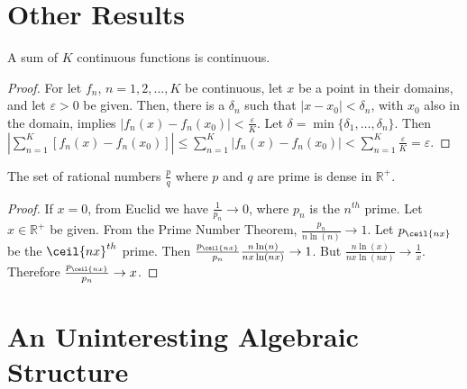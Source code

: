 \documentclass[crop=false,class=book,oneside]{standalone}
\begin{document}
        \section{Other Results}
            \begin{theorem}
                A sum of $K$ continuous functions is continuous. 
            \end{theorem}
            \begin{proof}
                For let $f_n$, $n=1,2,\hdots,K$ be continuous,
                let $x$ be a point in their domains, and let
                $\varepsilon>0$ be given. Then, there is a
                $\delta_n$ such that $|x-x_0|<\delta_n$, with
                $x_0$ also in the domain, implies
                $|f_n(x)-f_n(x_0)|<\frac{\varepsilon}{K}$.
                Let $\delta=\min\{\delta_1,\hdots,\delta_n\}$. Then
                $|\sum_{n=1}^{K}[f_n(x)-f_n(x_0)]|\leq%
                  \sum_{n=1}^{K}|f_n(x)-f_n(x_0)|<%
                  \sum_{n=1}^{K}\frac{\varepsilon}{K}=\varepsilon$.
            \end{proof}
            \begin{theorem}
                The set of rational numbers $\frac{p}{q}$ where $p$
                and $q$ are prime is dense in $\mathbb{R}^{+}$.
            \end{theorem}
            \begin{proof}
                If $x=0$, from Euclid we have
                $\frac{1}{p_n}\rightarrow 0$,
                where $p_n$ is the $n^{th}$ prime. Let
                $x\in\mathbb{R}^{+}$ be given. From the Prime Number
                Theorem, $\frac{p_n}{n\ln(n)}\rightarrow 1$. Let
                $p_{\ceil{nx}}$ be the $\ceil{nx}^{th}$ prime. Then
                $\frac{p_{\ceil{nx}}}{p_n}\frac{n\ln(n)}{nx\ln(nx)}
                \rightarrow 1$. But
                $\frac{n\ln(x)}{nx\ln(nx)}\rightarrow \frac{1}{x}$.
                Therefore $\frac{p_{\ceil{nx}}}{p_n}\rightarrow x$.
            \end{proof}
        \section{An Uninteresting Algebraic Structure}
\end{document}
